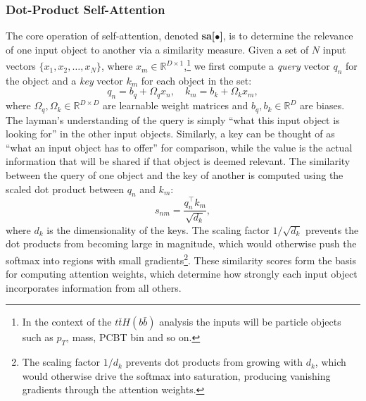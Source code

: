 \subsubsection{Dot-Product Self-Attention}
The core operation of self-attention, denoted \textbf{sa[$\bullet$]}, is to determine the relevance of one input object to another via a similarity measure. 
Given a set of $N$ input vectors 
$\{x_1, x_2, \dots, x_N\}$, where $x_m \in \mathbb{R}^{D \times 1}$,\footnote{In the context of the $t\bar{t}H(b\bar{b})$ analysis the inputs will be particle objects such as $p_T$, mass, PCBT bin and so on.}
we first compute a \emph{query} vector $q_n$ for the object and a \emph{key} vector $k_m$ for each object in the set:
\begin{equation}
q_n = b_q + \Omega_q x_n, \quad k_m = b_k + \Omega_k x_m,
\end{equation}
where $\Omega_q, \Omega_k \in \mathbb{R}^{D \times D}$ are learnable weight matrices and $b_q, b_k \in \mathbb{R}^D$ are biases. The layman’s understanding of the query is simply ``what this input object is looking for'' in the other input objects. 
Similarly, a key can be thought of as ``what an input object has to offer'' for comparison, while the value is the actual information that will be shared if that object is deemed relevant. The similarity between the query of one object and the key of another is computed using the scaled dot product between $q_n$ and $k_m$:  
\begin{equation}
s_{nm} = \frac{q_n^\top k_m}{\sqrt{d_k}},
\end{equation}
where $d_k$ is the dimensionality of the keys. The scaling factor $1/\sqrt{d_k}$ prevents the dot products from becoming large in magnitude, which would otherwise push the softmax into regions with small gradients\footnote{The scaling factor $1/d_k$ prevents dot products from growing with $d_k$, which would otherwise drive the softmax into saturation, producing vanishing gradients through the attention weights.}. These similarity scores form the basis for computing attention weights, which determine how strongly each input object incorporates information from all others.

